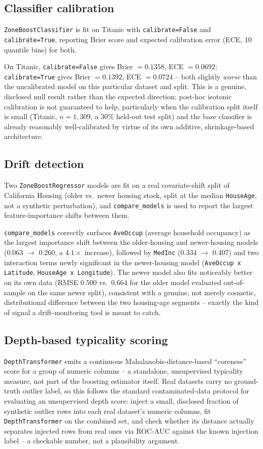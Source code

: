 \documentclass[11pt]{article}
\begin{document}
\subsection{Classifier calibration}
\texttt{ZoneBoostClassifier} is fit on Titanic with
\texttt{calibrate=False} and \texttt{calibrate=True}, reporting Brier score
and expected calibration error (ECE, 10 quantile bins) for both.

On Titanic, \texttt{calibrate=False} gives Brier $=0.1358$, ECE $=0.0692$;
\texttt{calibrate=True} gives Brier $=0.1392$, ECE $=0.0724$ -- both
slightly \emph{worse} than the uncalibrated model on this particular
dataset and split. This is a genuine, disclosed null result rather than
the expected direction: post-hoc isotonic calibration is not guaranteed to
help, particularly when the calibration split itself is small (Titanic,
$n=1{,}309$, a 30\% held-out test split) and the base classifier is already
reasonably well-calibrated by virtue of its own additive, shrinkage-based
architecture.

\subsection{Drift detection}
Two \texttt{ZoneBoostRegressor} models are fit on a real covariate-shift
split of California Housing (older vs.\ newer housing stock, split at the
median \texttt{HouseAge}, not a synthetic perturbation), and
\texttt{compare\_models} is used to report the largest feature-importance
shifts between them.

\texttt{compare\_models} correctly surfaces \texttt{AveOccup} (average
household occupancy) as the largest importance shift between the
older-housing and newer-housing models (0.063 $\to$ 0.260, a
$4.1\times$ increase), followed by \texttt{MedInc} (0.334 $\to$ 0.407) and
two interaction terms newly significant in the newer-housing model
(\texttt{AveOccup x Latitude}, \texttt{HouseAge x Longitude}). The newer
model also fits noticeably better on its own data (RMSE $0.500$ vs.\
$0.664$ for the older model evaluated out-of-sample on the same newer
split), consistent with a genuine, not merely cosmetic, distributional
difference between the two housing-age segments -- exactly the kind of
signal a drift-monitoring tool is meant to catch.

\subsection{Depth-based typicality scoring}
\texttt{DepthTransformer} emits a continuous Mahalanobis-distance-based
``coreness'' score for a group of numeric columns -- a standalone,
unsupervised typicality measure, not part of the boosting estimator itself.
Real datasets carry no ground-truth outlier label, so this follows the
standard contaminated-data protocol for evaluating an unsupervised depth
score: inject a small, disclosed fraction of synthetic outlier rows into
each real dataset's numeric columns, fit \texttt{DepthTransformer} on the
combined set, and check whether its distance actually separates injected
rows from real ones via ROC-AUC against the known injection label -- a
checkable number, not a plausibility argument.
\end{document}
